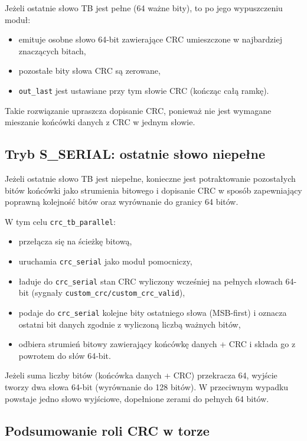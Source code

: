 Jeżeli ostatnie słowo TB jest pełne (64 ważne bity), to po jego wypuszczeniu moduł:
\begin{itemize}
    \item emituje osobne słowo 64-bit zawierające CRC umieszczone w najbardziej znaczących bitach,
    \item pozostałe bity słowa CRC są zerowane,
    \item \texttt{out\_last} jest ustawiane przy tym słowie CRC (kończąc całą ramkę).
\end{itemize}

Takie rozwiązanie upraszcza dopisanie CRC, ponieważ nie jest wymagane mieszanie końcówki danych z CRC w jednym słowie.

\subsection{Tryb S\_SERIAL: ostatnie słowo niepełne}
\label{subsec:serial_mode}

Jeżeli ostatnie słowo TB jest niepełne, konieczne jest potraktowanie pozostałych bitów końcówki jako strumienia bitowego i dopisanie CRC w sposób zapewniający poprawną kolejność bitów oraz wyrównanie do granicy 64 bitów.

W tym celu \texttt{crc\_tb\_parallel}:
\begin{itemize}
    \item przełącza się na ścieżkę bitową,
    \item uruchamia \texttt{crc\_serial} jako moduł pomocniczy,
    \item ładuje do \texttt{crc\_serial} stan CRC wyliczony wcześniej na pełnych słowach 64-bit (sygnały \texttt{custom\_crc/custom\_crc\_valid}),
    \item podaje do \texttt{crc\_serial} kolejne bity ostatniego słowa (MSB-first) i oznacza ostatni bit danych zgodnie z wyliczoną liczbą ważnych bitów,
    \item odbiera strumień bitowy zawierający końcówkę danych + CRC i składa go z powrotem do słów 64-bit.
\end{itemize}

Jeżeli suma liczby bitów (końcówka danych + CRC) przekracza 64, wyjście tworzy dwa słowa 64-bit (wyrównanie do 128 bitów). W przeciwnym wypadku powstaje jedno słowo wyjściowe, dopełnione zerami do pełnych 64 bitów.


\subsection{Podsumowanie roli CRC w torze}
\label{subsec:crc_summary}

